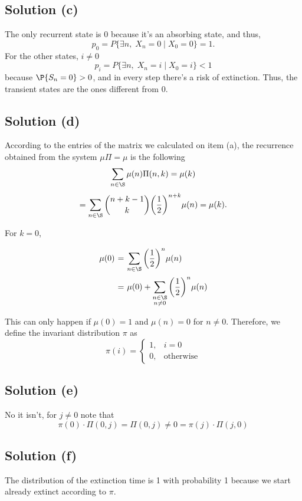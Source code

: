 \subsection*{Solution (c)}

The only recurrent state is 0 because it's an absorbing state, and thus,
\[ p_{0} = P\{\exists n,\; X_n = 0\;|\; X_0 = 0\} = 1. \]
For the other states, $i\neq 0$
\[ p_{i} = P\{\exists n,\; X_n = i\;|\; X_0 = i\} < 1 \]
because $\P\{S_n = 0\} > 0$, and in every step there's a risk of extinction. Thus, the transient states are the ones different from 0.

\subsection*{Solution (d)}

According to the entries of the matrix we calculated on item (a), the recurrence obtained from the system $\mu \Pi = \mu$ is the following
\[ \sum_{n\in \S} \mu(n) \Pi(n,k) = \mu(k) \]
\[ = \sum_{n\in\S} \binom{n+k-1}{k} {\left( \frac{1}{2} \right)}^{n+k} \mu(n) = \mu(k). \]

For $k = 0$,
\[ \everymath{\displaystyle}
\arraycolsep=1.8pt\def\arraystretch{2.5}
\begin{array}{rcl}
    \mu(0) & = & \sum_{n\in\S} {\left( \frac{1}{2} \right)}^{n} \mu(n)\\
    & = & \mu(0) + \sum_{\substack{n\in\S\\ n\neq 0}} {\left( \frac{1}{2} \right)}^{n} \mu(n)
\end{array}  \]

This can only happen if $\mu(0) = 1$ and $\mu(n) = 0$ for $n\neq 0$. Therefore, we define the invariant distribution $\pi$ as
\[ \pi(i) = \begin{cases}
    1,& i = 0\\
    0, & \mbox{otherwise}
\end{cases} \]

\subsection*{Solution (e)}

No it isn't, for $j \neq 0$ note that
\[ \pi(0) \cdot \Pi(0,j) = \Pi(0,j) \neq 0 = \pi(j) \cdot \Pi(j,0) \]

\subsection*{Solution (f)}

The distribution of the extinction time is 1 with probability 1 because we start already extinct according to $\pi$.